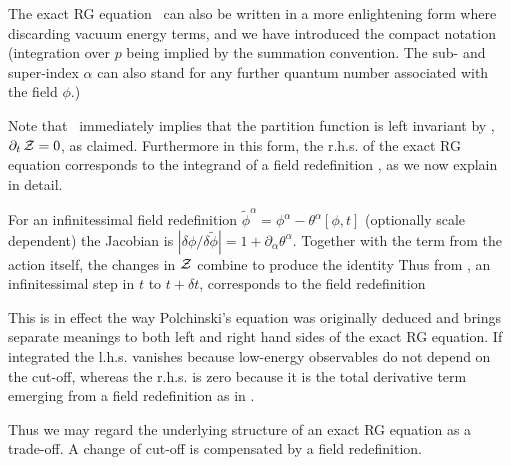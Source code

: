 The exact RG equation \polchinski\ 
can also be written in a more enlightening form
\eqn{}
where
\eqn{}
discarding vacuum energy terms,
and we have introduced the compact notation
\eqn{}
(integration over $p$ being implied by the summation convention.
The sub- and super-index $\alpha$ can also stand for
any further quantum number associated with the field $\phi$.)

Note that \wegner\ immediately implies that the partition function
\eqn\ptnfn{{\cal Z}= \int {\cal D}\phi \ {\rm e}^{-S}} 
is left invariant by \polchinski, \ie $\partial_t\,{\cal Z}=0$, as
claimed.  Furthermore in this form, the r.h.s. of the exact RG
equation corresponds to the integrand of a field redefinition \alg, as
we now explain in detail.

For an infinitessimal field redefinition
$\tilde\phi^\alpha=\phi^\alpha-\theta^\alpha[\phi,t]$ (optionally scale
dependent) the Jacobian is $\left|{\delta\phi/ \delta\tilde\phi}
\right|= 1+ \partial_\alpha \theta^\alpha$.  Together with the term
from the action itself, the changes in ${\cal Z}$ combine to produce
the identity \eqn{} 
Thus from \wegner, an infinitessimal step in $t$ to $t+\delta t$,
corresponds to the field redefinition
\eqn\psiredef{\tilde\phi^\alpha=\phi^\alpha-\delta
t\,\Psi^\alpha[\phi,t]\ .}

This is in effect the way Polchinski's equation was originally
deduced and brings separate meanings to
both left and right hand sides of the exact RG equation. If integrated
\eqn\newwegner{
 0=\partial_t \int {\cal D} \phi \ {\rm e}^{-S}
= \int {\cal D}\phi \  \partial_\alpha\left(\Psi^\alpha {\rm e}^{-S}
  \right)=0\ ,
}
the l.h.s. vanishes because low-energy  observables do not depend 
on the cut-off, whereas the r.h.s. is zero because
it is the total derivative term emerging from
a field redefinition as  in \fieldredefid. 

Thus we may regard 
the underlying structure of an exact RG equation
as a trade-off.
A change of cut-off is compensated by a field redefinition. 





